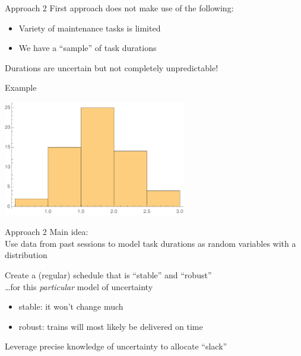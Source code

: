 \begin{frame}{Approach 2}
	First approach does not make use of the following:
	\begin{itemize}
		\item Variety of maintenance tasks is limited
		\item We have a ``sample'' of task durations
	\end{itemize}

	\medskip

	Durations are uncertain but not completely unpredictable!

	\pause

	Example
	\bigskip
	\begin{center}
		\includegraphics[width=0.6\textwidth]{histo}
	\end{center}
\end{frame}


\begin{frame}{Approach 2}
	Main idea:\\
	Use data from past sessions to model task durations as random variables with a distribution

	\medskip

	Create a (regular) schedule that is ``stable'' and ``robust'' \\
	\ldots for this \emph{particular} model of uncertainty
	\begin{itemize}
		\item stable: it won't change much
		\item robust: trains will most likely be delivered on time
	\end{itemize}

	\medskip
	Leverage precise knowledge of uncertainty to allocate ``slack''
\end{frame}

